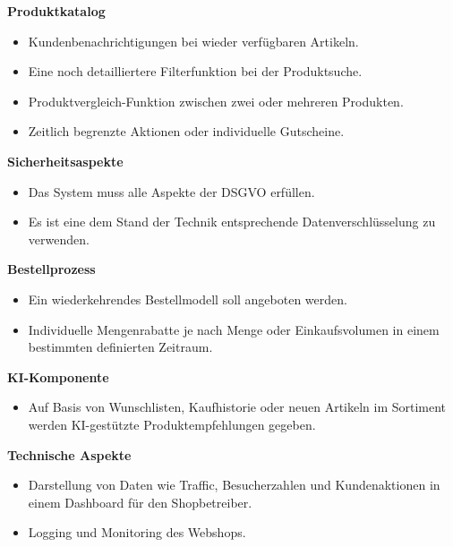 \documentclass[%
	12pt,
	a4paper,
	oneside,
	parskip=full
]{scrbook}
\begin{document}
	\vspace{0.5cm}
	\textbf{Produktkatalog}
	\begin{itemize}
		\item Kundenbenachrichtigungen bei wieder verfügbaren Artikeln.
		\item Eine noch detailliertere Filterfunktion bei der Produktsuche.
		\item Produktvergleich-Funktion zwischen zwei oder mehreren Produkten.
		\item Zeitlich begrenzte Aktionen oder individuelle Gutscheine.
	\end{itemize}

	\vspace{0.5cm}
	\textbf{Sicherheitsaspekte}
	\begin{itemize}
		\item Das System muss alle Aspekte der DSGVO erfüllen.
		\item Es ist eine dem Stand der Technik entsprechende Datenverschlüsselung zu verwenden.
	\end{itemize}

	\vspace{0.5cm}
	\textbf{Bestellprozess}
	\begin{itemize}
		\item Ein wiederkehrendes Bestellmodell soll angeboten werden.
		\item Individuelle Mengenrabatte je nach Menge oder Einkaufsvolumen in einem bestimmten definierten Zeitraum.
	\end{itemize}

	\vspace{0.5cm}
	\textbf{KI-Komponente}
	\begin{itemize}
		\item Auf Basis von Wunschlisten, Kaufhistorie oder neuen Artikeln im Sortiment werden KI-gestützte Produktempfehlungen gegeben.
	\end{itemize}

	\vspace{0.5cm}
	\textbf{Technische Aspekte}
	\begin{itemize}
		\item Darstellung von Daten wie Traffic, Besucherzahlen und Kundenaktionen in einem Dashboard für den Shopbetreiber.
		\item Logging und Monitoring des Webshops.
	\end{itemize}
\end{document}
